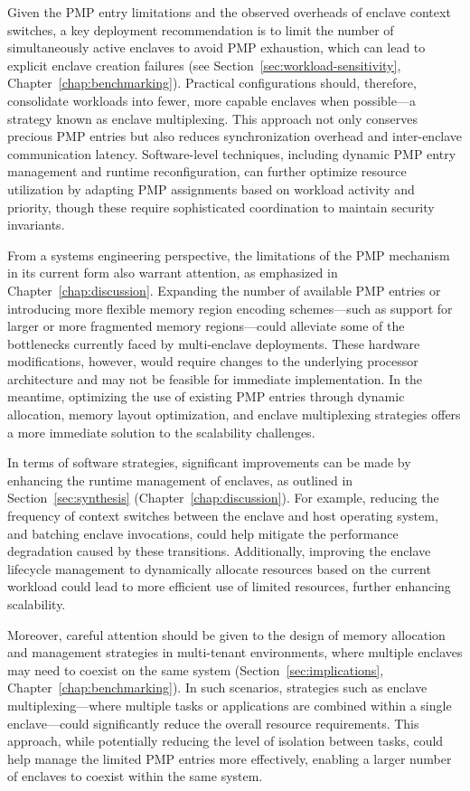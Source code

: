 Given the PMP entry limitations and the observed overheads of enclave context switches, a key deployment recommendation is to limit the number of simultaneously active enclaves to avoid PMP exhaustion, which can lead to explicit enclave creation failures (see Section~\ref{sec:workload-sensitivity}, Chapter~\ref{chap:benchmarking}). Practical configurations should, therefore, consolidate workloads into fewer, more capable enclaves when possible—a strategy known as enclave multiplexing. This approach not only conserves precious PMP entries but also reduces synchronization overhead and inter-enclave communication latency. Software-level techniques, including dynamic PMP entry management and runtime reconfiguration, can further optimize resource utilization by adapting PMP assignments based on workload activity and priority, though these require sophisticated coordination to maintain security invariants.

From a systems engineering perspective, the limitations of the PMP mechanism in its current form also warrant attention, as emphasized in Chapter~\ref{chap:discussion}. Expanding the number of available PMP entries or introducing more flexible memory region encoding schemes—such as support for larger or more fragmented memory regions—could alleviate some of the bottlenecks currently faced by multi-enclave deployments. These hardware modifications, however, would require changes to the underlying processor architecture and may not be feasible for immediate implementation. In the meantime, optimizing the use of existing PMP entries through dynamic allocation, memory layout optimization, and enclave multiplexing strategies offers a more immediate solution to the scalability challenges.

In terms of software strategies, significant improvements can be made by enhancing the runtime management of enclaves, as outlined in Section~\ref{sec:synthesis} (Chapter~\ref{chap:discussion}). For example, reducing the frequency of context switches between the enclave and host operating system, and batching enclave invocations, could help mitigate the performance degradation caused by these transitions. Additionally, improving the enclave lifecycle management to dynamically allocate resources based on the current workload could lead to more efficient use of limited resources, further enhancing scalability.

Moreover, careful attention should be given to the design of memory allocation and management strategies in multi-tenant environments, where multiple enclaves may need to coexist on the same system (Section~\ref{sec:implications}, Chapter~\ref{chap:benchmarking}). In such scenarios, strategies such as enclave multiplexing—where multiple tasks or applications are combined within a single enclave—could significantly reduce the overall resource requirements. This approach, while potentially reducing the level of isolation between tasks, could help manage the limited PMP entries more effectively, enabling a larger number of enclaves to coexist within the same system.

